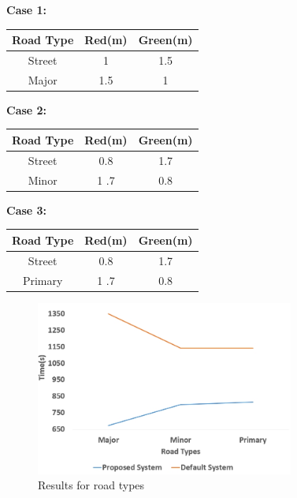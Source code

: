 \documentclass[conference]{IEEEtran}
\begin{document}
    \begin{table}[h!]
	\centering\textbf{Case 1:}
	\centering
	\begin{tabular}{||c c c||} 
		\hline
		\textbf{Road Type} & \textbf{Red(m)} & \textbf{Green(m)} \\ [0.5ex] 
		\hline\hline
		Street   & 1   & 1.5     \\ 
		\hline
		Major  & 1.5   & 1     \\
		\hline
		
	\end{tabular}
\end{table}

        \begin{table}[h!]
	\centering\textbf{Case 2:}
	\centering
	\begin{tabular}{||c c c||} 
		\hline
		\textbf{Road Type} & \textbf{Red(m)} & \textbf{Green(m)} \\ [0.5ex] 
		\hline\hline
		Street   & 0.8   & 1.7     \\ 
		\hline
		Minor  & 1 .7  & 0.8     \\
		\hline
		
	\end{tabular}
\end{table}
    
\begin{table}[h!]
	\centering\textbf{Case 3:}
	\centering
	\begin{tabular}{||c c c||} 
		\hline
		\textbf{Road Type} & \textbf{Red(m)} & \textbf{Green(m)} \\ [0.5ex] 
		\hline\hline
		Street   & 0.8   & 1.7     \\ 
		\hline
		Primary  & 1 .7  & 0.8     \\
		\hline
		
	\end{tabular}
\end{table}

 \begin{figure}[h!]
     \centering
     \includegraphics[width=8.5cm]{roadTypes.jpg}
     \caption{Results for road types}
     \label{fig:my_label}
 \end{figure}   
 
\end{document}
